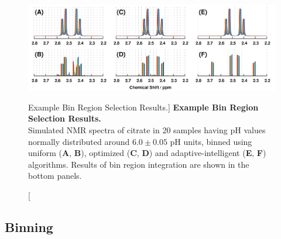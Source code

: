 \begin{figure}[ht!]
\includegraphics[width=6.5in]{figs/mva/05.png}
\caption
      [Example Bin Region Selection Results.]{
  {\bf Example Bin Region Selection Results.}
  \\
  Simulated \hnmr{} NMR spectra of citrate in 20 samples having pH values
  normally distributed around $6.0 \pm 0.05$ pH units, binned using uniform
  ({\bf A}, {\bf B}), optimized ({\bf C}, {\bf D}) and adaptive-intelligent
  ({\bf E}, {\bf F}) algorithms. Results of bin region integration are shown
  in the bottom panels.
}
\end{figure}

\subsection{Binning}

